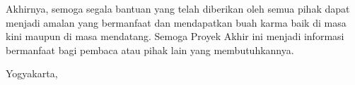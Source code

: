 Akhirnya, semoga segala bantuan yang telah diberikan oleh semua pihak dapat menjadi amalan yang bermanfaat dan mendapatkan buah karma baik di masa kini maupun di masa mendatang. Semoga Proyek Akhir ini menjadi informasi bermanfaat bagi pembaca atau pihak lain yang membutuhkannya.

\begin{flushright}
    Yogyakarta, \tglpengesahan\\[1.25cm]
    \penulis \\
    \nim
\end{flushright}